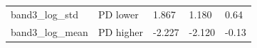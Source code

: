 \documentclass[11pt,a4paper]{article}
\begin{document}
\begin{center}
\begin{longtable}{>{\raggedright\arraybackslash}p{4.20cm}>{\raggedright\arraybackslash}p{2.55cm}>{\raggedleft\arraybackslash}p{2.55cm}>{\raggedleft\arraybackslash}p{2.55cm}>{\raggedleft\arraybackslash}p{2.55cm}}
\hspace{0pt}band3\_\allowbreak{}log\_\allowbreak{}std & \hspace{0pt}PD lower & \hspace{0pt}1.867 & \hspace{0pt}1.180 & \hspace{0pt}0.64\\
\hspace{0pt}band3\_\allowbreak{}log\_\allowbreak{}mean & \hspace{0pt}PD higher & \hspace{0pt}-2.227 & \hspace{0pt}-2.120 & \hspace{0pt}-0.13\\
\end{longtable}\end{center}
\end{document}
